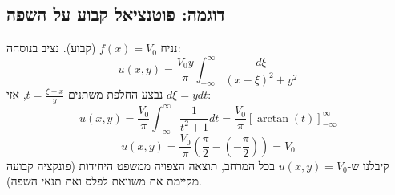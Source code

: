 \subsection{דוגמה: פוטנציאל קבוע על השפה}
נניח $f(x) = V_0$ (קבוע).
נציב בנוסחה:
\[ u(x,y) = \frac{V_0 y}{\pi} \int_{-\infty}^{\infty} \frac{d\xi}{(x-\xi)^2 + y^2} \]
נבצע החלפת משתנים $t = \frac{\xi - x}{y}$, אזי $d\xi = y dt$:
\[ u(x,y) = \frac{V_0}{\pi} \int_{-\infty}^{\infty} \frac{1}{t^2 + 1} dt = \frac{V_0}{\pi} [\arctan(t)]_{-\infty}^{\infty} \]
\[ u(x,y) = \frac{V_0}{\pi} \left( \frac{\pi}{2} - \left(-\frac{\pi}{2}\right) \right) = V_0 \]
קיבלנו ש-$u(x,y) = V_0$ בכל המרחב, תוצאה הצפויה ממשפט היחידות (פונקציה קבועה מקיימת את משוואת לפלס ואת תנאי השפה).